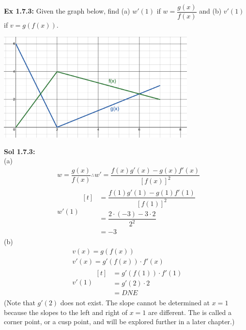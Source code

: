 \begin{tcolorbox}[example]
    \textbf{Ex 1.7.3: } Given the graph below, find (a) $w'(1)$ if $w = \dfrac{g(x)}{f(x)}$ and (b) $v'(1)$ if $v = g(f(x))$. \\

    \begin{center}
        \includegraphics[width = 0.75\textwidth]{Support/Chapter 1 Graphics/1.7-Graphic1.png}
    \end{center}
\end{tcolorbox}
\begin{tcolorbox}[solution]
    \textbf{Sol 1.7.3: } \\[11pt]
    (a) \begin{align*}
        & w = \dfrac{g(x)}{f(x)} \therefore w' = \dfrac{f(x)g'(x) - g(x)f'(x)}{[f(x)]^2} \\[11pt]
        & w'(1) \begin{aligned}[t]
            & = \dfrac{f(1)g'(1) - g(1)f'(1)}{[f(1)]^2} \\[11pt]
            & = \dfrac{2 \cdot (-3) - 3 \cdot 2}{2^2} \\[11pt]
            & = \boxed{-3}
        \end{aligned}
    \end{align*}
    (b) \begin{align*}
        & v(x) = g(f(x)) \\[11pt]
        & v'(x) = g'(f(x)) \cdot f'(x) \\[11pt]
        & v'(1) \begin{aligned}[t]
            & = g'(f(1)) \cdot f'(1) \\[11pt]
            & = g'(2) \cdot 2 \\[11pt]
            & = \boxed{DNE}
        \end{aligned}
    \end{align*}
    (Note that $g'(2)$ does not exist. The slope cannot be determined at $x = 1$ because the slopes to the left and right of $x = 1$ are different. The is called a corner point, or a cusp point, and will be explored further in a later chapter.)
\end{tcolorbox} \vspace{11pt}

